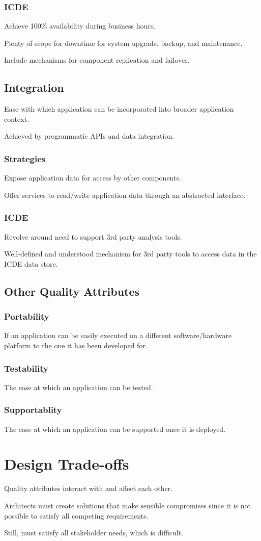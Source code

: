 \documentclass[11pt]{article}
\begin{document}
\subsubsection{ICDE}
\label{sec:org25a4109}
Achieve 100\% availability during business hours.

Plenty of scope for downtime for system upgrade, backup, and maintenance.

Include mechanisms for component replication and failover.
\subsection{Integration}
\label{sec:orgc3be8ca}
Ease with which application can be incorporated into broader application context.

Achieved by programmatic APIs and data integration.
\subsubsection{Strategies}
\label{sec:org042e6da}
Expose application data for access by other components.

Offer services to read/write application data through an abstracted interface.
\subsubsection{ICDE}
\label{sec:org55d3646}
Revolve around need to support 3rd party analysis tools.

Well-defined and understood mechanism for 3rd party tools to access data in the ICDE data store.
\subsection{Other Quality Attributes}
\label{sec:org8c5c568}
\subsubsection{Portability}
\label{sec:org2973397}
If an application can be easily executed on a different software/hardware platform to the one
it has been developed for.
\subsubsection{Testability}
\label{sec:org1503e0e}
The ease at which an application can be tested.
\subsubsection{Supportablity}
\label{sec:orgcb7ae82}
The ease at which an application can be supported once it is deployed.
\section{Design Trade-offs}
\label{sec:orga72750b}
Quality attributes interact with and affect each other.

Architects must create solutions that make sensible compromises since it is not possible to satisfy
all competing requirements.

Still, must satisfy all stakeholder needs, which is difficult.
\end{document}
